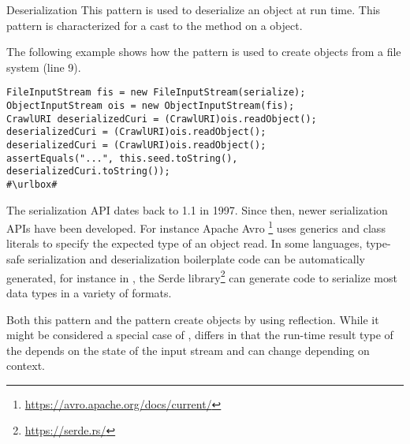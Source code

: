 \begin{pattern}{Deserialization}
This pattern is used to deserialize an object at run time.
This pattern is characterized for a cast to the  method on a  object.

\instances{}
The following example
shows how the \thisp{} pattern is used to create objects from a file system (line 9).

\def\urlvar{http://bit.ly/internetarchive_heritrix3_2SF4j7k}
\begin{verbatim}
FileInputStream fis = new FileInputStream(serialize);
ObjectInputStream ois = new ObjectInputStream(fis);
CrawlURI deserializedCuri = (CrawlURI)ois.readObject();
deserializedCuri = (CrawlURI)ois.readObject();
deserializedCuri = (CrawlURI)ois.readObject();
assertEquals("...", this.seed.toString(), deserializedCuri.toString());
#\urlbox#
\end{verbatim}

\issues{}
  The serialization API dates back to \java{} 1.1 in 1997.
  Since then, newer serialization APIs have been developed.
  For instance Apache Avro%
  \footnote{\url{https://avro.apache.org/docs/current/}}
  uses generics and class literals to specify the expected type of an object
  read. 
  In some languages, type-safe serialization and deserialization 
  boilerplate code can be automatically generated, for instance
  in \rust{}, the Serde library\footnote{\url{https://serde.rs/}}
  can generate code to serialize most data types
  in a variety of formats.

Both this pattern and the  pattern create objects by using reflection.
While it might be considered a special case of , \thisp{} differs
  in that the run-time result type of the  depends on
  the state of the input stream and can change depending on context.
 
\end{pattern}
